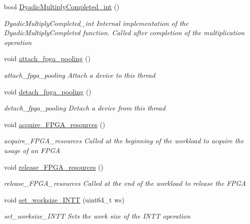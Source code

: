 \begin{DoxyCompactItemize}
bool \hyperlink{namespaceintel_1_1hexl_1_1fpga_add004a71ed21d585bbf5ee7f88cdc492}{Dyadic\-Multiply\-Completed\-\_\-int} ()
\begin{DoxyCompactList}\small\item\em Dyadic\-Multiply\-Completed\-\_\-int Internal implementation of the Dyadic\-Multiply\-Completed function. Called after completion of the multiplication operation \end{DoxyCompactList}\item 
void \hyperlink{namespaceintel_1_1hexl_1_1fpga_aa7d5b6c103f848f3b642938edf97ae22}{attach\-\_\-fpga\-\_\-pooling} ()
\begin{DoxyCompactList}\small\item\em attach\-\_\-fpga\-\_\-pooling Attach a device to this thread \end{DoxyCompactList}\item 
void \hyperlink{namespaceintel_1_1hexl_1_1fpga_a768c1508c039dd1e8664cfec3a7bb159}{detach\-\_\-fpga\-\_\-pooling} ()
\begin{DoxyCompactList}\small\item\em detach\-\_\-fpga\-\_\-pooling Detach a device from this thread \end{DoxyCompactList}\item 
void \hyperlink{namespaceintel_1_1hexl_1_1fpga_aaca739e67538e6072f74ac311231616c}{acquire\-\_\-\-F\-P\-G\-A\-\_\-resources} ()
\begin{DoxyCompactList}\small\item\em acquire\-\_\-\-F\-P\-G\-A\-\_\-resources Called at the beginning of the workload to acquire the usage of an F\-P\-G\-A \end{DoxyCompactList}\item 
void \hyperlink{namespaceintel_1_1hexl_1_1fpga_a030c29b7b3fa954ef8da1c9031911647}{release\-\_\-\-F\-P\-G\-A\-\_\-resources} ()
\begin{DoxyCompactList}\small\item\em release\-\_\-\-F\-P\-G\-A\-\_\-resources Called at the end of the workload to release the F\-P\-G\-A \end{DoxyCompactList}\item 
void \hyperlink{namespaceintel_1_1hexl_1_1fpga_a187bc608bc5c9fc658019b87539a4b81}{set\-\_\-worksize\-\_\-\-I\-N\-T\-T} (uint64\-\_\-t ws)
\begin{DoxyCompactList}\small\item\em set\-\_\-worksize\-\_\-\-I\-N\-T\-T Sets the work size of the I\-N\-T\-T operation \end{DoxyCompactList}\item 

\end{DoxyCompactItemize}
